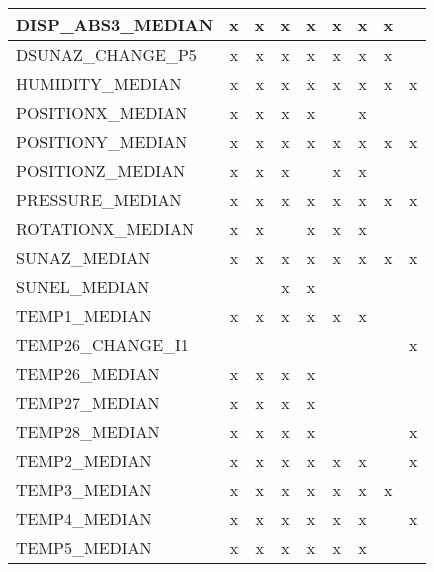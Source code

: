 \begin{longtable}{|lcccccccc|}
    DISP\_ABS3\_MEDIAN &      x &      x &      x &      x &      x &      x &      x &        \\ \hline
    DSUNAZ\_CHANGE\_P5 &      x &      x &      x &      x &      x &      x &      x &        \\ \hline
    HUMIDITY\_MEDIAN &      x &      x &      x &      x &      x &      x &      x &      x \\ \hline
    POSITIONX\_MEDIAN &      x &      x &      x &      x &        &      x &        &        \\ \hline
    POSITIONY\_MEDIAN &      x &      x &      x &      x &      x &      x &      x &      x \\ \hline
    POSITIONZ\_MEDIAN &      x &      x &      x &        &      x &      x &        &        \\ \hline
    PRESSURE\_MEDIAN &      x &      x &      x &      x &      x &      x &      x &      x \\ \hline
    ROTATIONX\_MEDIAN &      x &      x &        &      x &      x &      x &        &        \\ \hline
    SUNAZ\_MEDIAN &      x &      x &      x &      x &      x &      x &      x &      x \\ \hline
    SUNEL\_MEDIAN &        &        &      x &      x &        &        &        &        \\ \hline
    TEMP1\_MEDIAN &      x &      x &      x &      x &      x &      x &        &        \\ \hline
    TEMP26\_CHANGE\_I1 &        &        &        &        &        &        &        &      x \\ \hline
    TEMP26\_MEDIAN &      x &      x &      x &      x &        &        &        &        \\ \hline
    TEMP27\_MEDIAN &      x &      x &      x &      x &        &        &        &        \\ \hline
    TEMP28\_MEDIAN &      x &      x &      x &      x &        &        &        &      x \\ \hline
    TEMP2\_MEDIAN &      x &      x &      x &      x &      x &      x &        &      x \\ \hline
    TEMP3\_MEDIAN &      x &      x &      x &      x &      x &      x &      x &        \\ \hline
    TEMP4\_MEDIAN &      x &      x &      x &      x &      x &      x &        &      x \\ \hline
    TEMP5\_MEDIAN &      x &      x &      x &      x &      x &      x &        &        \\ \hline

\end{longtable}
